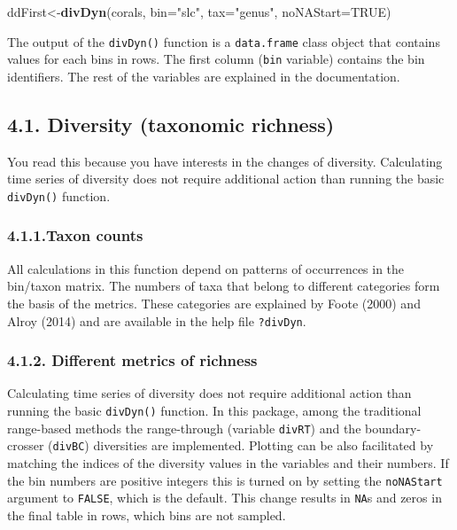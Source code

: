 \documentclass[]{article}
\newenvironment{Shaded}{\begin{snugshade}}{\end{snugshade}}
\newcommand{\KeywordTok}[1]{\textcolor[rgb]{0.13,0.29,0.53}{\textbf{{#1}}}}
\newcommand{\DataTypeTok}[1]{\textcolor[rgb]{0.13,0.29,0.53}{{#1}}}
\newcommand{\StringTok}[1]{\textcolor[rgb]{0.31,0.60,0.02}{{#1}}}
\newcommand{\OtherTok}[1]{\textcolor[rgb]{0.56,0.35,0.01}{{#1}}}
\newcommand{\NormalTok}[1]{{#1}}
\begin{document}
\begin{Shaded}
\begin{Highlighting}[]
\NormalTok{ddFirst<-}\KeywordTok{divDyn}\NormalTok{(corals, }\DataTypeTok{bin=}\StringTok{"slc"}\NormalTok{, }\DataTypeTok{tax=}\StringTok{"genus"}\NormalTok{, }\DataTypeTok{noNAStart=}\OtherTok{TRUE}\NormalTok{)}
\end{Highlighting}
\end{Shaded}

The output of the \texttt{divDyn()} function is a \texttt{data.frame}
class object that contains values for each bins in rows. The first
column (\texttt{bin} variable) contains the bin identifiers. The rest of
the variables are explained in the documentation.

\subsection{4.1. Diversity (taxonomic
richness)}\label{diversity-taxonomic-richness}

You read this because you have interests in the changes of diversity.
Calculating time series of diversity does not require additional action
than running the basic \texttt{divDyn()} function.

\subsubsection{4.1.1.Taxon counts}\label{taxon-counts}

All calculations in this function depend on patterns of occurrences in
the bin/taxon matrix. The numbers of taxa that belong to different
categories form the basis of the metrics. These categories are explained
by Foote (2000) and Alroy (2014) and are available in the help file
\texttt{?divDyn}.

\subsubsection{4.1.2. Different metrics of
richness}\label{different-metrics-of-richness}

Calculating time series of diversity does not require additional action
than running the basic \texttt{divDyn()} function. In this package,
among the traditional range-based methods the range-through (variable
\texttt{divRT}) and the boundary-crosser (\texttt{divBC}) diversities
are implemented. Plotting can be also facilitated by matching the
indices of the diversity values in the variables and their numbers. If
the bin numbers are positive integers this is turned on by setting the
\texttt{noNAStart} argument to \texttt{FALSE}, which is the default.
This change results in \texttt{NA}s and zeros in the final table in
rows, which bins are not sampled.
\end{document}
